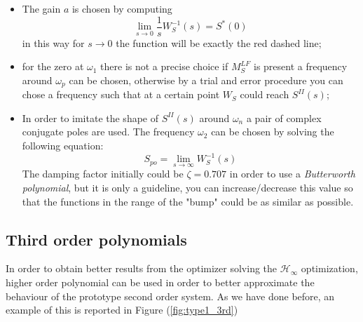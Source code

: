 \documentclass[a4paper, 12pt]{article}
\begin{document}
    \begin{itemize}
        \itemsep-0.3em
        \item The gain $a$ is chosen by computing 
        \begin{equation}
            \lim_{s\to{0}} \frac{1}{s}W_S^{-1}(s)=S^{*}(0)
        \end{equation}
        in this way for $s\to0$ the function will be exactly the red dashed line; 
        \item for the zero at $\omega_1$ there is not a precise choice if $M_S^{LF}$ is present a frequency around $\omega_p$ can be chosen, otherwise by a trial and error procedure you can chose a frequency such that at a certain point $W_S$ could reach $S^{II}(s)$; 
        \item In order to imitate the shape of $S^{II}(s)$ around $\omega_n$ a pair of complex conjugate poles are used. The frequency $\omega_2$ can be chosen by solving the following equation:
        \begin{equation}\label{eq:Spo_limit}
            S_{po}=\lim_{s\to{\infty}} W_S^{-1}(s)
        \end{equation}
        \noindent
        The damping factor initially could be $\zeta=0.707$ in order to use a \textit{Butterworth polynomial}, but it is only a guideline, you can increase/decrease this value so that the functions in the range of the "bump" could be as similar  as possible.
    \end{itemize}

    \subsection{Third order polynomials}
 
    In order to obtain better results from the optimizer solving the $\mathcal{H}_\infty$ optimization, higher order polynomial can be used in order to better approximate the behaviour of the prototype second order system. As we have done before, an example of this is reported in Figure (\ref{fig:type1_3rd})
\end{document}

